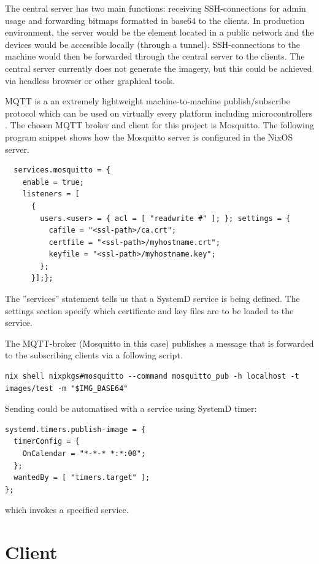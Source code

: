 The central server has two main functions: receiving SSH-connections
for admin usage and forwarding bitmaps formatted in base64 to the
clients. In production environment, the server would be the element
located in a public network and the devices would be accessible
locally (through a tunnel). SSH-connections to the machine would then
be forwarded through the central server to the clients. The central
server currently does not generate the imagery, but this could be
achieved via headless browser or other graphical tools.

MQTT is a an extremely lightweight machine-to-machine publish/subscribe
protocol which can be used on virtually every platform including
microcontrollers \cite{oasisopenMQTTVersion}. The chosen MQTT broker
and client for this project is Mosquitto. The following program snippet shows
how the Mosquitto server is configured in the NixOS server.
\begin{lstlisting}
  services.mosquitto = {
    enable = true;
    listeners = [
      {
        users.<user> = { acl = [ "readwrite #" ]; }; settings = {
          cafile = "<ssl-path>/ca.crt";
          certfile = "<ssl-path>/myhostname.crt";
          keyfile = "<ssl-path>/myhostname.key";
        };
      }];};
\end{lstlisting}

The ''services'' statement tells us that a SystemD service is being
defined. The settings section specify which certificate and key files
are to be loaded to the service.

The MQTT-broker (Mosquitto in this case) publishes a message that is
forwarded to the subscribing clients via a following script.

\begin{lstlisting}
nix shell nixpkgs#mosquitto --command mosquitto_pub -h localhost -t
images/test -m "$IMG_BASE64"
\end{lstlisting}

Sending could be automatised with a service using SystemD timer:
\begin{lstlisting}
systemd.timers.publish-image = {
  timerConfig = {
    OnCalendar = "*-*-* *:*:00";
  };
  wantedBy = [ "timers.target" ];
};
\end{lstlisting}

which invokes a specified service.

\section{Client}

